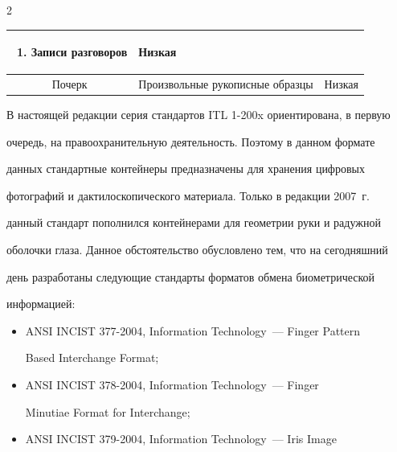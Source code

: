 \begin{multicols}{2}
\begin{table}
\begin{center}
\begin{tabular}{|c|p{70mm}|c|}
\begin{enumerate}[1.]
\item Записи разговоров

\end{enumerate}

\vspace*{-14pt}

&  Низкая\\

\hline

Почерк & 

Произвольные рукописные образцы & Низкая\\

\hline

\end{tabular}

\end{center}

\vspace*{-3pt}

\end{table}



  В настоящей редакции серия стандартов ITL 1-200x ориентирована, в первую 

очередь, на правоохранительную деятельность. Поэтому в данном формате 

данных стандартные контейнеры предназначены для хранения цифровых 

фотографий и дактилоскопического материала. Только в редакции 2007~г.\ 

данный стандарт пополнился контейнерами для геометрии руки и радужной 

оболочки глаза. Данное обстоятельство обусловлено тем, что на сегодняшний 

день разработаны следующие стандарты форматов обмена биометрической 

ин\-фор\-ма\-цией:

  \begin{itemize}

\item ANSI INCIST 377-2004, Information Technology~--- Finger Pattern 

Based Interchange Format;

\item ANSI INCIST 378-2004, Information Technology~--- Finger 

Minutiae Format for Interchange;

\item ANSI INCIST 379-2004, Information Technology~--- Iris Image 


\end{itemize}
\end{multicols}
